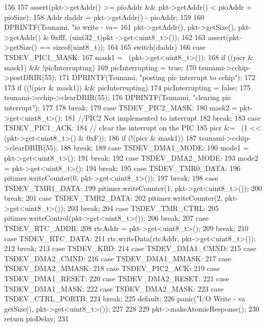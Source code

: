 \begin{DoxyCode}
156 {
157     assert(pkt->getAddr() >= pioAddr && pkt->getAddr() < pioAddr + pioSize);
158     Addr daddr = pkt->getAddr() - pioAddr;
159 
160     DPRINTF(Tsunami, "io write - va=%
161             pkt->getAddr(), pkt->getSize(), pkt->getAddr() & 0xfff, (uint32_t)pkt
      ->get<uint8_t>());
162 
163     assert(pkt->getSize() == sizeof(uint8_t));
164 
165     switch(daddr) {
166       case TSDEV_PIC1_MASK:
167         mask1 = ~(pkt->get<uint8_t>());
168         if ((picr & mask1) && !picInterrupting) {
169             picInterrupting = true;
170             tsunami->cchip->postDRIR(55);
171             DPRINTF(Tsunami, "posting pic interrupt to cchip\n");
172         }
173         if ((!(picr & mask1)) && picInterrupting) {
174             picInterrupting = false;
175             tsunami->cchip->clearDRIR(55);
176             DPRINTF(Tsunami, "clearing pic interrupt\n");
177         }
178         break;
179       case TSDEV_PIC2_MASK:
180         mask2 = pkt->get<uint8_t>();
181         //PIC2 Not implemented to interrupt
182         break;
183       case TSDEV_PIC1_ACK:
184         // clear the interrupt on the PIC
185         picr &= ~(1 << (pkt->get<uint8_t>() & 0xF));
186         if (!(picr & mask1))
187             tsunami->cchip->clearDRIR(55);
188         break;
189       case TSDEV_DMA1_MODE:
190         mode1 = pkt->get<uint8_t>();
191         break;
192       case TSDEV_DMA2_MODE:
193         mode2 = pkt->get<uint8_t>();
194         break;
195       case TSDEV_TMR0_DATA:
196         pitimer.writeCounter(0, pkt->get<uint8_t>());
197         break;
198       case TSDEV_TMR1_DATA:
199         pitimer.writeCounter(1, pkt->get<uint8_t>());
200         break;
201       case TSDEV_TMR2_DATA:
202         pitimer.writeCounter(2, pkt->get<uint8_t>());
203         break;
204       case TSDEV_TMR_CTRL:
205         pitimer.writeControl(pkt->get<uint8_t>());
206         break;
207       case TSDEV_RTC_ADDR:
208         rtcAddr = pkt->get<uint8_t>();
209         break;
210       case TSDEV_RTC_DATA:
211         rtc.writeData(rtcAddr, pkt->get<uint8_t>());
212         break;
213       case TSDEV_KBD:
214       case TSDEV_DMA1_CMND:
215       case TSDEV_DMA2_CMND:
216       case TSDEV_DMA1_MMASK:
217       case TSDEV_DMA2_MMASK:
218       case TSDEV_PIC2_ACK:
219       case TSDEV_DMA1_RESET:
220       case TSDEV_DMA2_RESET:
221       case TSDEV_DMA1_MASK:
222       case TSDEV_DMA2_MASK:
223       case TSDEV_CTRL_PORTB:
224         break;
225       default:
226         panic("I/O Write - va%
      getSize(), pkt->get<uint8_t>());
227     }
228 
229     pkt->makeAtomicResponse();
230     return pioDelay;
231 }
\end{DoxyCode}



